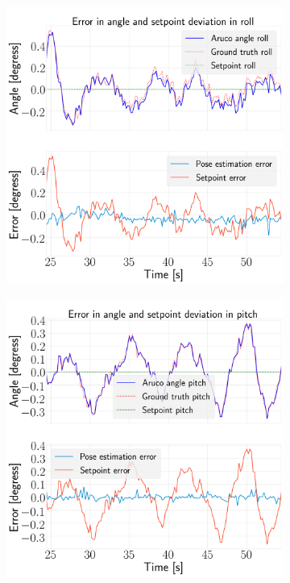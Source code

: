 \documentclass[../Head/report.tex]{subfiles}
\begin{document}
\begin{figure}[H]
    \centering
    \begin{subfigure}[t]{.30\textwidth}
        \centering
        \includegraphics[width=\textwidth]{../Figures/hold_pose_using_aruco_pose_estimation/pose_error_roll_test1.png}
        \caption{}
        \label{fig:hold_pose_estimation_test5_roll}
    \end{subfigure}
     \hspace{0.2em}
    \begin{subfigure}[t]{.30\textwidth}
        \centering
        \includegraphics[width=\textwidth]{../Figures/hold_pose_using_aruco_pose_estimation/pose_error_pitch_test1.png}

\end{subfigure}
\end{figure}
\end{document}
